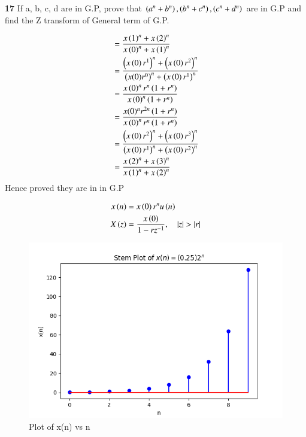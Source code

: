 \documentclass[journal,12pt,twocolumn]{IEEEtran}
\theoremstyle{remark}
\begin{document}


\vspace{3cm}

\title{}
\author{EE23BTECH11047 - Deepakreddy P
}
\maketitle
\newpage
\bigskip

\noindent \textbf{17} \quad 
If a, b, c, d are in G.P, prove that 
$ \left(a^{n} + b^{n}\right),\left(b^{n} + c^{n}\right),\left(c^{n} + d^{n}\right) $ are in G.P and find the Z transform of General term of G.P.\\
\solution

\begin{center}
    \begin{table}[ht]
        
    \end{table}
\end{center}

\begin{align} 
 &=\frac{x\left(1\right)^n + x\left(2\right)^n}{x\left(0\right)^n + x\left(1\right)^n}  \\
&= \frac{\left(x\left(0\right)r^1\right)^n + \left(x\left(0\right)r^2\right)^n}{\left(x(0)r^0\right)^n + \left(x\left(0\right)r^1\right)^n}\\
&= \frac{x\left(0\right)^n r^n \left(1 + r^n\right)}{x\left(0\right)^n \left(1 + r^n\right)} \\
&= \frac{x(0)^n r^{2n} \left(1 + r^n\right)}{x\left(0\right)^n r^n \left(1 + r^n\right)}\\
&= \frac{\left(x\left(0\right) r^2\right)^n + \left(x\left(0\right) r^3\right)^n}{\left(x\left(0\right) r^1\right)^n + \left(x\left(0\right) r^2\right)^n}\\
&= \frac{x\left(2\right)^n + x\left(3\right)^n}{x\left(1\right)^n + x\left(2\right)^n}
\end{align}
Hence proved they are in in G.P

\begin{align}
    x\brak{n} &= x\brak{0}r^{n} u\brak{n}\\
    X\brak{z} &= \frac{x\brak{0}}{1-rz^{-1}}, \quad |z|>|r|
\end{align}
\newpage
\begin{figure}[h]
   \centering
   \includegraphics[width=1\columnwidth]{figs/gp.png}
   \caption{Plot of x(n) vs n}
   \label{fig: Stem plot of x(n)}
\end{figure}
\end{document}
